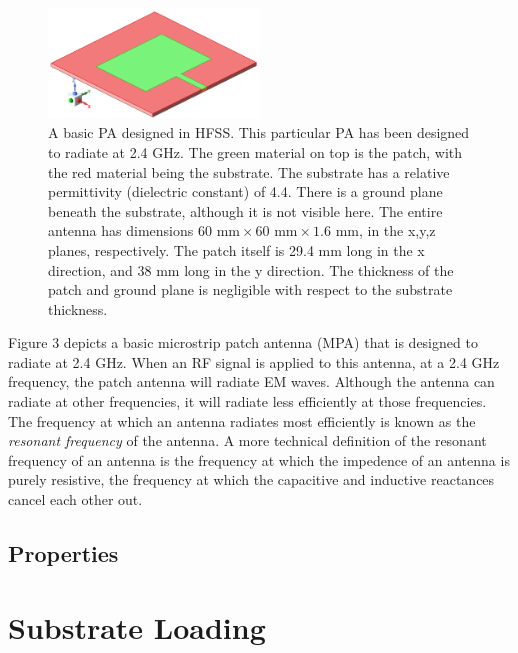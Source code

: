 \documentclass[12pt]{article}
\begin{document}
\begin{figure}[h]
    \centering
    \includegraphics[width=0.5\textwidth]{2.4GHz-basic-pa.png}
    \caption{A basic PA designed in HFSS. This particular PA has been designed to radiate at 2.4 GHz. The green material on top is the patch, with the red material being the substrate. The substrate has a relative permittivity (dielectric constant) of 4.4. There is a ground plane beneath the substrate, although it is not visible here. The entire antenna has dimensions $60 \text{ mm} \times 60 \text{ mm} \times 1.6 \text{ mm}$, in the x,y,z planes, respectively. The patch itself is 29.4 mm long in the x direction, and 38 mm long in the y direction. The thickness of the patch and ground plane is negligible with respect to the substrate thickness. }
\end{figure}

Figure 3 depicts a basic microstrip patch antenna (MPA) that is designed to radiate at 2.4 GHz. When an RF signal is applied to this antenna, at a 2.4 GHz frequency, the patch antenna will radiate EM waves. Although the antenna can radiate at other frequencies, it will radiate less efficiently at those frequencies. The frequency at which an antenna radiates most efficiently is known as the \textit{resonant frequency} of the antenna. A more technical definition of the resonant frequency of an antenna is the frequency at which the impedence of an antenna is purely resistive, the frequency at which the capacitive and inductive reactances cancel each other out.

\subsection{Properties}

\section{Substrate Loading}

\newpage


\end{document}
